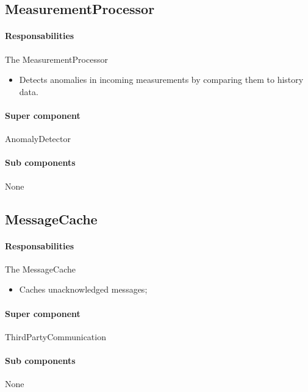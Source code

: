 \documentclass[a4paper,10pt]{article}
\begin{document}
\subsection{MeasurementProcessor}
\paragraph{Responsabilities} 
The MeasurementProcessor
\begin{itemize}
	\item Detects anomalies in incoming measurements by comparing them to history data.
\end{itemize}

\paragraph{Super component} AnomalyDetector

\paragraph{Sub components} None

\subsection{MessageCache}
\paragraph{Responsabilities} 
The MessageCache
\begin{itemize}
    \item Caches unacknowledged messages;
\end{itemize}

\paragraph{Super component} ThirdPartyCommunication

\paragraph{Sub components} None
\end{document}
